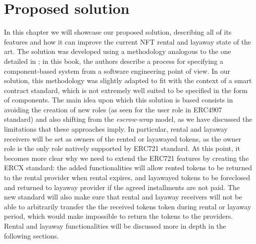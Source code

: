 \documentclass[english, LaM, oneside]{sapthesis}%
\begin{document}
\chapter{Proposed solution}
\label{chap:2}
In this chapter we will showcase our proposed solution, describing all of its features and how it can improve the current NFT rental and layaway state of the art. \newline
The solution was developed using a methodology analogous to the one detailed in \cite{ref:UML}; in this book, the authors describe a process for specifying a component-based system from a software engineering point of view. In our solution, this methodology was slightly adapted to fit with the context of a smart contract standard, which is not extremely well suited to be specified in the form of components.\newline
The main idea upon which this solution is based consists in avoiding the creation of new roles (as seen for the user role in ERC4907 standard) and also shifting from the \textit{escrow-wrap} model, as we have discussed the limitations that these approaches imply. \newline
In particular, rental and layaway receivers will be set as owners of the rented or layawayed tokens, as the owner role is the only role natively supported by ERC721 standard. At this point, it becomes more clear why we need to extend the ERC721 features by creating the ERCX standard: the added functionalities will allow rented tokens to be returned to the rental provider when rental expires, and layawayed tokens to be foreclosed and returned to layaway provider if the agreed installments are not paid. The new standard will also make sure that rental and layaway receivers will not be able to arbitrarily transfer the the received tokens token during rental or layaway period, which would make impossible to return the tokens to the providers. \newline
Rental and layaway functionalities will be discussed more in depth in the following sections.
\end{document}
